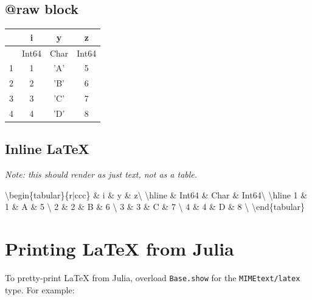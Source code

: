 \subsection{@raw block}



\label{12968435574917214693}{}



\begin{tabular}{r|ccc}
        & i & y & z\\
        \hline
        & Int64 & Char & Int64\\
        \hline
        1 & 1 & 'A' & 5 \\
        2 & 2 & 'B' & 6 \\
        3 & 3 & 'C' & 7 \\
        4 & 4 & 'D' & 8 \\
\end{tabular}



\subsection{Inline LaTeX}



\label{7647595013011656041}{}


\emph{Note: this should render as just text, not as a table.}



{\textbackslash}begin\{tabular\}\{r|ccc\}         \& i \& y \& z{\textbackslash}
        {\textbackslash}hline         \& Int64 \& Char \& Int64{\textbackslash}
        {\textbackslash}hline         1 \& 1 \& {\textquotesingle}A{\textquotesingle} \& 5 {\textbackslash}
        2 \& 2 \& {\textquotesingle}B{\textquotesingle} \& 6 {\textbackslash}
        3 \& 3 \& {\textquotesingle}C{\textquotesingle} \& 7 {\textbackslash}
        4 \& 4 \& {\textquotesingle}D{\textquotesingle} \& 8 {\textbackslash}
{\textbackslash}end\{tabular\}



\section{Printing LaTeX from Julia}



\label{10914504187442884412}{}


To pretty-print LaTeX from Julia, overload \texttt{Base.show} for the \texttt{MIME{\textquotedbl}text/latex{\textquotedbl}} type. For example:




